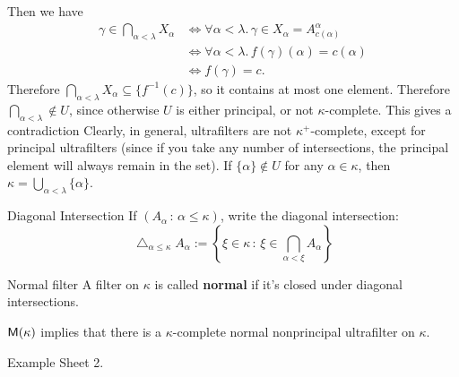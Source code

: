 \documentclass{article}
\begin{document}
Then we have \begin{align*} 
    \gamma \in \bigcap_{\alpha < \lambda}X_{\alpha} &\Leftrightarrow \forall \alpha <\lambda.\, \gamma \in X_{\alpha} = A_{c(\alpha)}^{\alpha}\\
    &\Leftrightarrow \forall \alpha <\lambda.\, f(\gamma)(\alpha)=c(\alpha)\\
    &\Leftrightarrow f(\gamma) = c.
\end{align*}
Therefore $\bigcap\limits_{\alpha<\lambda} X_{\alpha} \subseteq \{f^{-1}(c)\}$, so it contains at most one element. Therefore $\bigcap\limits_{\alpha < \lambda} \notin U$, since otherwise $U$ is either principal, or not $\kappa$-complete. This gives a contradiction \endproof
Clearly, in general, ultrafilters are not $\kappa^{+}$-complete, except for principal ultrafilters (since if you take any number of intersections, the principal element will always remain in the set). If $\{\alpha\} \notin U$ for any $\alpha \in \kappa$, then $\kappa = \bigcup\limits_{\alpha<\lambda}\{\alpha\}$.
\begin{fancydefine}{Diagonal Intersection}
    If $(A_{\alpha} \, : \, \alpha \leq \kappa)$, write the diagonal intersection:
    \[ \bigtriangleup_{\alpha \leq \kappa} A_{\alpha} := \left\{ \xi \in \kappa \, : \, \xi \in \bigcap_{\alpha < \xi} A_{\alpha}\right\}\] 
\end{fancydefine}
\begin{fancydefine}{Normal filter}
    A filter on $\kappa$ is called \textbf{normal} if it's closed under diagonal intersections.
\end{fancydefine}
\begin{fancythm}{}
    $\mathsf{M}(\kappa)$ implies that there is a $\kappa$-complete normal nonprincipal ultrafilter on $\kappa$.
\end{fancythm}
\proof Example Sheet 2.
\endproof 
\end{document}
